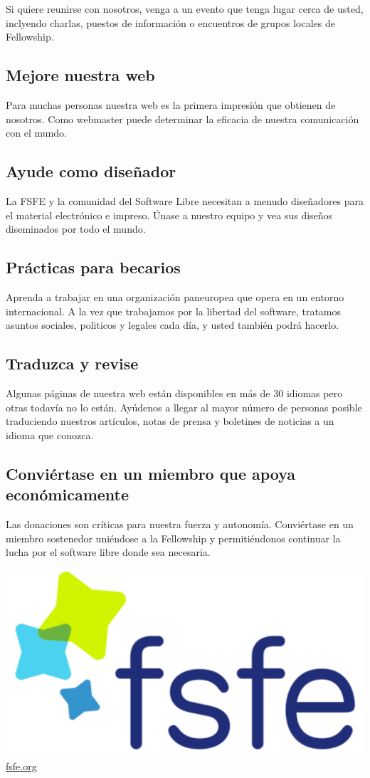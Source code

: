 \documentclass[10pt,foldmark,tumble]{leaflet}
\begin{document}
    Si quiere reunirse con nosotros, venga a un evento que tenga lugar cerca de usted, inclyendo charlas, puestos de información o encuentros de grupos locales de Fellowship.
    
\subsection{Mejore nuestra web}

    Para muchas personas nuestra web es la primera impresión que obtienen de nosotros. Como webmaster puede determinar la eficacia de nuestra comunicación con el mundo.
    
\subsection{Ayude como diseñador}

    La FSFE y la comunidad del Software Libre necesitan a menudo diseñadores para el material electrónico e impreso. Únase a nuestro equipo y vea sus diseños diseminados por todo el mundo.
    
\subsection{Prácticas para becarios}

    Aprenda a trabajar en una organización paneuropea que opera en un entorno internacional. A la vez que trabajamos por la libertad del software, tratamos asuntos sociales, politicos y legales cada día, y usted también podrá hacerlo.

\subsection{Traduzca y revise}

    Algunas páginas de nuestra web están disponibles en más de 30 idiomas pero otras todavía no lo están. Ayúdenos a llegar al mayor número de personas posible traduciendo nuestros artículos, notas de prensa y boletines de noticias a un idioma que conozca.
    
\subsection{Conviértase en un miembro que apoya económicamente}

    Las donaciones son críticas para nuestra fuerza y autonomía. Conviértase en un miembro sostenedor uniéndose a la Fellowship y permitiéndonos continuar la lucha por el software libre donde sea necesaria.
    
\vspace{15em}


 \includegraphics[scale=0.45]{logo.pdf} \\
\centering \Huge \url{fsfe.org}
\end{document}

